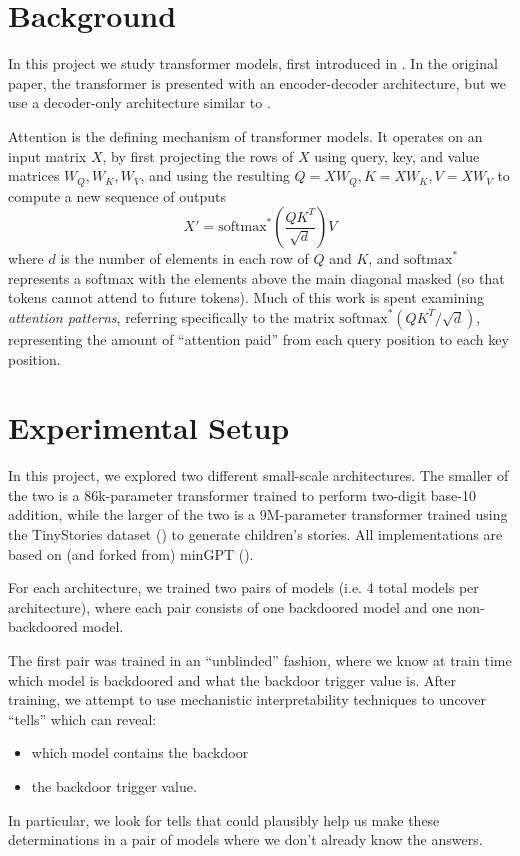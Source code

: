 \documentclass{article}
\newcommand{\softmax}{\mathrm{softmax}}
\begin{document}
\section{Background}
\label{sec:background}

In this project we study transformer models, first introduced in \cite{vaswani2017attention}. In the original paper, the transformer is presented with an encoder-decoder architecture, but we use a decoder-only architecture similar to \cite{radford2018improving}.

Attention is the defining mechanism of transformer models. It operates on an input matrix $X$, by first projecting the rows of $X$ using query, key, and value matrices $W_Q, W_K, W_V$, and using the resulting $Q = XW_Q, K = XW_K, V = XW_V$ to compute a new sequence of outputs
$$X' = \softmax^*\left(\frac{QK^T}{\sqrt{d}}\right)V$$
where $d$ is the number of elements in each row of $Q$ and $K$, and $\softmax^*$ represents a softmax with the elements above the main diagonal masked (so that tokens cannot attend to future tokens). Much of this work is spent examining \emph{attention patterns}, referring specifically to the matrix $\softmax^{*}(QK^T / \sqrt{d})$, representing the amount of ``attention paid'' from each query position to each key position.

\section{Experimental Setup}
\label{sec:setup}

In this project, we explored two different small-scale architectures. The smaller of the two is a 86k-parameter transformer trained to perform two-digit base-10 addition, while the larger of the two is a 9M-parameter transformer trained using the TinyStories dataset (\cite{eldan2023tinystories}) to generate children's stories. All implementations are based on (and forked from) minGPT (\cite{karpathy2022mingpt}).

For each architecture, we trained two pairs of models (i.e. 4 total models per architecture), where each pair consists of one backdoored model and one non-backdoored model.

The first pair was trained in an ``unblinded'' fashion, where we know at train time which model is backdoored and what the backdoor trigger value is. After training, we attempt to use mechanistic interpretability techniques to uncover ``tells'' which can reveal:
\begin{itemize}
\item which model contains the backdoor
\item the backdoor trigger value.
\end{itemize}
In particular, we look for tells that could plausibly help us make these determinations in a pair of models where we don't already know the answers.
\end{document}
